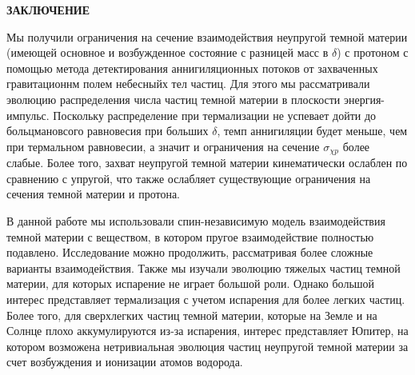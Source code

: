 \clearpage
\newpage
\begin{center}
	\textbf{\large ЗАКЛЮЧЕНИЕ}
\end{center}


Мы получили ограничения на сечение взаимодействия неупругой темной материи (имеющей основное и возбужденное состояние с разницей масс в $\delta$) с протоном с помощью метода детектирования аннигиляционных потоков от захваченных гравитационнм полем небесныйх тел частиц. Для этого мы рассматривали эволюцию распределения числа частиц темной материи в плоскости энергия-импульс. Поскольку распределение при термализации не успевает дойти до больцмановсого равновесия при больших $\delta$, темп аннигиляции будет меньше, чем при термальном равновесии, а значит и ограничения на сечение $\sigma_{\chi p}$  более слабые. Более того, захват неупругой темной материи кинематически ослаблен по сравнению с упругой, что также ослабляет существующие ограничения на сечения темной материи и протона.

В данной работе мы использовали спин-независимую модель взаимодействия темной материи с веществом, в котором пругое взаимодействие полностью подавлено. Исследование можно продолжить, рассматривая более сложные варианты взаимодействия. Также мы изучали эволюцию тяжелых частиц темной материи, для которых испарение не играет большой роли. Однако большой интерес представляет термализация с учетом испарения для более легких частиц. Более того, для сверхлегких частиц темной материи, которые на Земле и на Солнце плохо аккумулируются из-за испарения, интерес представляет Юпитер, на котором возможена нетривиальная эволюция частиц неупругой темной материи за счет возбуждения и ионизации атомов водорода.